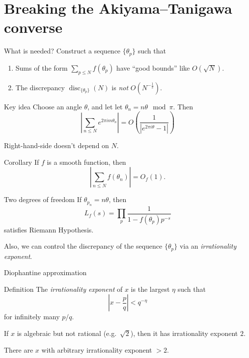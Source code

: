 \documentclass{beamer}
\DeclareMathOperator{\disc}{disc}
\begin{document}
\section{Breaking the Akiyama--Tanigawa converse}

\begin{frame}{What is needed?}
Construct a sequence $\{\theta_p\}$ such that 
\begin{enumerate}
\item<1-> Sums of the form $\sum_{p\leqslant N} f(\theta_p)$ have ``good bounds'' like $O(\sqrt N)$.
\item<2-> The discrepancy $\disc_{\{\theta_p\}}(N)$ is \emph{not} $O(N^{-\frac 1 2})$. 
\end{enumerate}
\end{frame}

\begin{frame}{Key idea}
Choose an angle $\theta$, and let let $\theta_n = n\theta \mod \pi$. Then 
\[
	\left|\sum_{n\leqslant N} e^{2\pi i m \theta_n}\right| = O\left(\frac{1}{|e^{2\pi i \theta}-1|}\right)
\]
\pause

\alert{Right-hand-side doesn't depend on $N$.}
\pause

\begin{block}{Corollary}
If $f$ is a smooth function, then 
\[
	\left|\sum_{n\leqslant N} f(\theta_n)\right| = O_f(1) .
\]
\end{block}
\end{frame}

\begin{frame}{Two degrees of freedom}
If $\theta_{p_n} = n \theta$, then 
\[
	L_f(s) = \prod_p \frac{1}{1-f(\theta_p)p^{-s}}
\]
satisfies Riemann Hypothesis. 
\pause

Also, we can control the discrepancy of the sequence $\{\theta_p\}$ via an 
\emph{irrationality exponent}.
\end{frame}

\begin{frame}{Diophantine approximation}
\begin{block}{Definition}
The \emph{irrationality exponent} of $x$ is the largest $\eta$ such that 
\[
	\left| x - \frac p q\right| < q^{-\eta}
\]
for infinitely many $p/q$. 
\end{block}
\pause

\begin{theorem}
If $x$ is algebraic but not rational (e.g.~$\sqrt 2$), then it has irrationality exponent $2$. 
\end{theorem}
\pause

\begin{theorem}
There are $x$ with arbitrary irrationality exponent $>2$. 
\end{theorem}
\end{frame}
\end{document}
